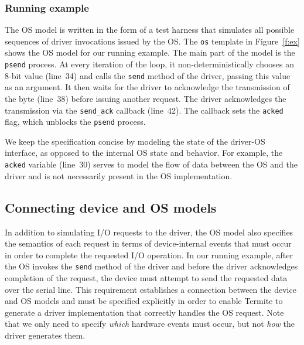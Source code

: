 \documentclass{book}
\newcommand{\termite}{Termite\xspace}
\theoremstyle{definition}
\newcommand{\src}[1]{\texttt{\small #1}}
\begin{document}
\subsubsection{Running example}

The OS model is written in the form of a test harness that simulates all possible sequences of driver invocations issued by the OS.  The \src{os} template in Figure~\ref{f:ex} shows the OS model for our running example.  The main part of the model is the \src{psend} process.  At every iteration of the loop, it non-deterministically chooses an 8-bit value (line~34) and calls the \src{send} method of the driver, passing this value as an argument.  It then waits for the driver to acknowledge the transmission of the byte (line~38) before issuing another request.  The driver acknowledges the transmission via the \src{send\_ack} callback (line~42).  The callback sets the \src{acked} flag, which unblocks the \src{psend} process.

We keep the specification concise by modeling the state of the driver-OS interface, as opposed to the internal OS state and behavior.  For example, the \src{acked} variable (line~30) serves to model the flow of data between the OS and the driver and is not necessarily present in the OS implementation.


\subsection{Connecting device and OS models}\label{s:virt}

In addition to simulating I/O requests to the driver, the OS model also specifies the semantics of each request in terms of device-internal events that must occur in order to complete the requested I/O operation.  In our running example, after the OS invokes the \src{send} method of the driver and before the driver acknowledges completion of the request, the device must attempt to send the requested data over the serial line.  This requirement establishes a connection between the device and OS models and must be specified explicitly in order to enable \termite to generate a driver implementation that correctly handles the OS request.  Note that we only need to specify \emph{which} hardware events must occur, but not \emph{how} the driver generates them.
\end{document}
